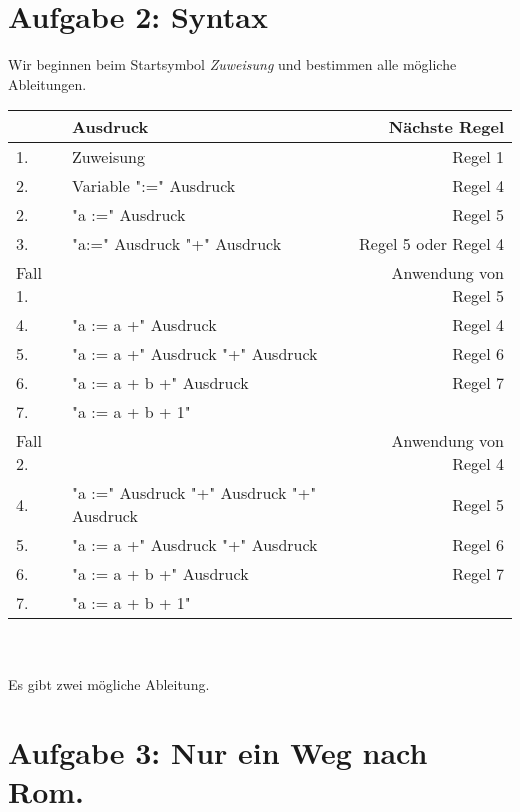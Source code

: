 \documentclass[11pt]{article} %
\begin{document}
\newpage

\section{Aufgabe 2: Syntax}

Wir beginnen beim Startsymbol \textit{Zuweisung} und bestimmen alle mögliche Ableitungen. \\

\begin{large}
\begin{tabular}{|l|l|r|}
\hline
&Ausdruck&Nächste Regel \\\hline
1.&Zuweisung&Regel 1\\
2.&Variable ":=" Ausdruck&Regel 4\\
2.&"a :=" Ausdruck&Regel 5\\
3.&"a:=" Ausdruck "+" Ausdruck&Regel 5 oder Regel 4\\\hline

Fall 1.&&Anwendung von Regel 5\\
4.&"a := a +" Ausdruck&Regel 4\\
5.&"a := a +" Ausdruck "+" Ausdruck&Regel 6\\
6.&"a := a + b +" Ausdruck&Regel 7\\
7.&"a := a + b + 1"&\\\hline

Fall 2.&&Anwendung von Regel 4\\
4.&"a :=" Ausdruck "+" Ausdruck "+" Ausdruck&Regel 5\\
5.&"a := a +" Ausdruck "+" Ausdruck&Regel 6\\
6.&"a := a + b +" Ausdruck&Regel 7\\
7.&"a := a + b + 1"&\\\hline
\end{tabular}
\end{large}
\\\\
Es gibt zwei mögliche Ableitung. \\

\section{Aufgabe 3: Nur ein Weg nach Rom.}
\end{document}
